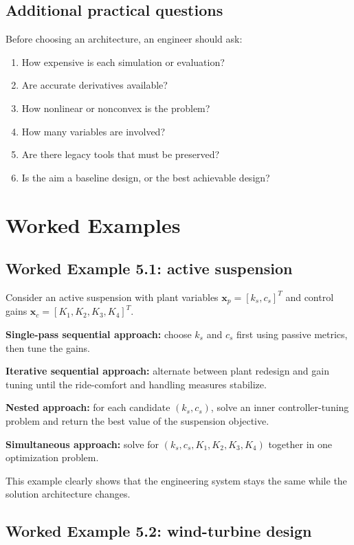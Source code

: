 \documentclass[11pt]{article}
\newcommand{\vect}[1]{\boldsymbol{#1}}
\newcommand{\xp}{\vect{x}_p}
\newcommand{\xc}{\vect{x}_c}
\begin{document}
\subsection{Additional practical questions}

Before choosing an architecture, an engineer should ask:
\begin{enumerate}[leftmargin=1.5em]
  \item How expensive is each simulation or evaluation?
  \item Are accurate derivatives available?
  \item How nonlinear or nonconvex is the problem?
  \item How many variables are involved?
  \item Are there legacy tools that must be preserved?
  \item Is the aim a baseline design, or the best achievable design?
\end{enumerate}

\section{Worked Examples}

\subsection{Worked Example 5.1: active suspension}

Consider an active suspension with plant variables $\xp=[k_s,c_s]^T$ and control gains $\xc=[K_1,K_2,K_3,K_4]^T$.

\textbf{Single-pass sequential approach:}
choose $k_s$ and $c_s$ first using passive metrics, then tune the gains.

\textbf{Iterative sequential approach:}
alternate between plant redesign and gain tuning until the ride-comfort and handling measures stabilize.

\textbf{Nested approach:}
for each candidate $(k_s,c_s)$, solve an inner controller-tuning problem and return the best value of the suspension objective.

\textbf{Simultaneous approach:}
solve for $(k_s,c_s,K_1,K_2,K_3,K_4)$ together in one optimization problem.

This example clearly shows that the engineering system stays the same while the solution architecture changes.

\subsection{Worked Example 5.2: wind-turbine design}
\end{document}
